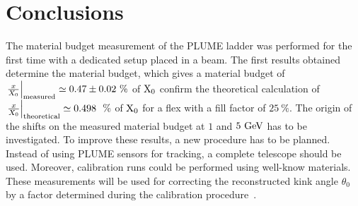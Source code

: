   \section{Conclusions}

  The material budget measurement of the \gls{PLUME} ladder was performed for the first time with a dedicated setup placed in a beam.
  The first results obtained determine the material budget, which gives a material budget of $\left. \frac{x}{X_0} \right|_{\rm{measured}} \simeq 0.47 \pm 0.02~\%$ of $\rm{X_0}$ confirm the theoretical calculation of $\left. \frac{x}{X_0}\right|_{\rm{theoretical}} \simeq 0.498~~\%$ of $\rm{X_0}$ for a flex with a fill factor of $25~\%$.
  The origin of the shifts on the measured material budget at $1$ and $5~\rm{GeV}$ has to be investigated.
  To improve these results, a new procedure has to be planned.
  Instead of using \gls{PLUME} sensors for tracking, a complete telescope should be used.
  Moreover, calibration runs could be performed using well-know materials.
  These measurements will be used for correcting the reconstructed kink angle $\theta_{0}$ by a factor determined during the calibration procedure~\cite{Stolzenberg:2016hrj}.

